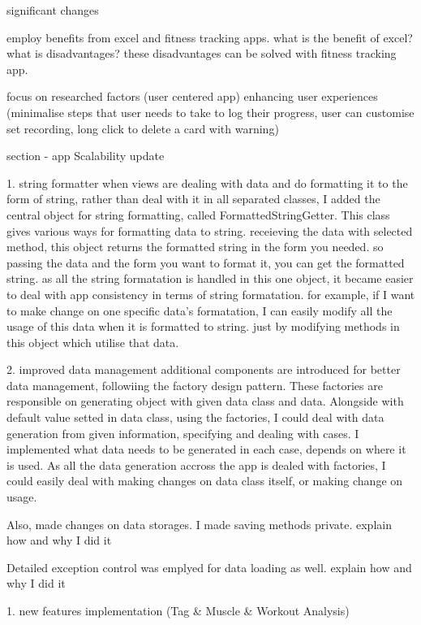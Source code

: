 
significant changes 

employ benefits from excel and fitness tracking apps.
what is the benefit of excel?
what is disadvantages?
these disadvantages can be solved with fitness tracking app. 


focus on researched factors (user centered app)
enhancing user experiences
(minimalise steps that user needs to take to log their progress, user can customise set recording, long click to delete a card with warning)




section - app  Scalability  update 

1. string formatter 
when views are dealing with data and do formatting it to the form of string,
rather than deal with it in all separated classes,
I added the central object for string formatting, called FormattedStringGetter.
This class gives various ways for formatting data to string. 
receieving the data with selected method, this object returns the formatted string in the form you needed.
so passing the data and the form you want to format it, you can get the formatted string.
as all the string formatation is handled in this one object,
it became easier to deal with app consistency in terms of string formatation.
for example, if I want to make change on one specific data's formatation,
I can easily modify all the usage of this data when it is formatted to string.
just by modifying methods in this object which utilise that data. 

2. improved data management
additional components are introduced for better data management, followiing the factory design pattern.
These factories are responsible on generating object with given data class and data.
Alongside with default value setted in data class,
using the factories, I could deal with data generation from given information, specifying and dealing with cases.
I implemented what data needs to be generated in each case, 
depends on where it is used.
As all the data generation accross the app is dealed with factories,
I could easily deal with making changes on data class itself, or making change on usage.

Also, made changes on data storages.
I made saving methods private.
explain how and why I did it 

Detailed exception control was emplyed for data loading as well.
 explain how and why I did it 



1. new features implementation (Tag & Muscle & Workout Analysis)

